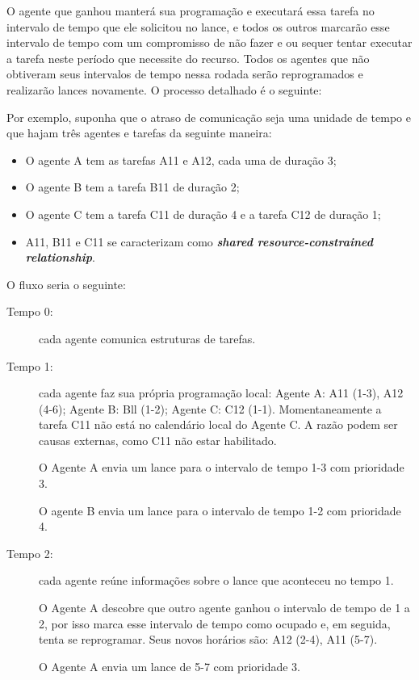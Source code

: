 \begin{description}
O agente que ganhou manterá sua programação e executará essa tarefa no intervalo de tempo que ele solicitou no lance, e todos os outros marcarão esse intervalo de tempo com um compromisso de não fazer e ou sequer tentar executar a tarefa neste período que necessite do recurso. Todos os agentes que não obtiveram seus intervalos de tempo nessa rodada serão reprogramados e realizarão lances novamente. O processo detalhado é o seguinte:




Por exemplo, suponha que o atraso de comunicação seja uma unidade de tempo e que hajam três agentes e tarefas da seguinte maneira: 
\begin{itemize}
    \item O agente A tem as tarefas A11 e A12, cada uma de duração 3;
    \item O agente B tem a tarefa B11 de duração 2;
    \item O agente C tem a tarefa C11 de duração 4 e a tarefa C12 de duração 1;
    \item A11, B11 e C11 se caracterizam como \textbf{\textit{shared resource-constrained relationship}}.
\end{itemize}

O fluxo seria o seguinte:
\begin{description}
    \item [Tempo 0:] cada agente comunica estruturas de tarefas.
    \item [Tempo 1:] cada agente faz sua própria programação local: Agente A: A11 (1-3), A12 (4-6); Agente B: Bll (1-2); Agente C: C12 (1-1). Momentaneamente a tarefa C11 não está no calendário local do Agente C. A razão podem ser causas externas, como C11 não estar habilitado.
    
    O Agente A envia um lance para o intervalo de tempo 1-3 com prioridade 3.
    
    O agente B envia um lance para o intervalo de tempo 1-2 com prioridade 4.

    \item [Tempo 2:] cada agente reúne informações sobre o lance que aconteceu no tempo 1.

    O Agente A descobre que outro agente ganhou o intervalo de tempo de 1 a 2, por isso marca esse intervalo de tempo como ocupado e, em seguida, tenta se reprogramar. Seus novos horários são: A12 (2-4), A11 (5-7). 
    
    O Agente A envia um lance de 5-7 com prioridade 3.
    

\end{description}
\end{description}
